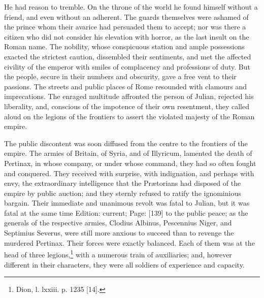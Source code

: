 He had reason to tremble. On the throne of the world he found himself without a friend, and even without an adherent. The guards themselves were ashamed of the prince whom their avarice had persuaded them to accept; nor was there a citizen who did not consider his elevation with horror, as the last insult on the Roman name. The nobility, whose conspicuous station and ample possessions exacted the strictest caution, dissembled their sentiments, and met the affected civility of the emperor with smiles of complacency and professions of duty. But the people, secure in their numbers and obscurity, gave a free vent to their passions. The streets and public places of Rome resounded with clamours and imprecations. The enraged multitude affronted the person of Julian, rejected his liberality, and, conscious of the impotence of their own resentment, they called aloud on the legions of the frontiers to assert the violated majesty of the Roman empire.

The public discontent was soon diffused from the centre to the frontiers of the empire. The armies of Britain, of Syria, and of Illyricum, lamented the death of Pertinax, in whose company, or under whose command, they had so often fought and conquered. They received with surprise, with indignation, and perhaps with envy, the extraordinary intelligence that the Prætorians had disposed of the empire by public auction; and they sternly refused to ratify the ignominious bargain. Their immediate and unanimous revolt was fatal to Julian, but it was fatal at the same time Edition: current; Page: [139] to the public peace; as the generals of the respective armies, Clodius Albinus, Pescennius Niger, and Septimius Severus, were still more anxious to succeed than to revenge the murdered Pertinax. Their forces were exactly balanced. Each of them was at the head of three legions,\footnote{Dion, l. lxxiii. p. 1235 [14].} with a numerous train of auxiliaries; and, however different in their characters, they were all soldiers of experience and capacity.

